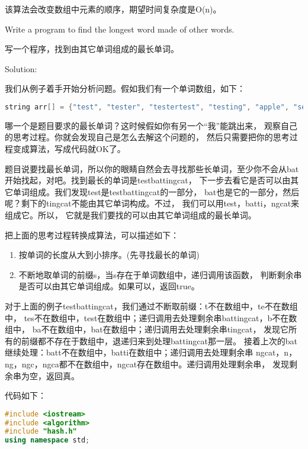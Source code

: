\begin{description}
\begin{description}
该算法会改变数组中元素的顺序，期望时间复杂度是O(n)。
\end{description}
%


\item[20.7] Write a program to find the longest word made of other words.

写一个程序，找到由其它单词组成的最长单词。

Solution:

我们从例子着手开始分析问题。假如我们有一个单词数组，如下：
\begin{lstlisting}[language=C++]
string arr[] = {"test", "tester", "testertest", "testing", "apple", "seattle", "banana",  "batting", "ngcat", "batti","bat", "testingtester", "testbattingcat"};
\end{lstlisting}
哪一个是题目要求的最长单词？这时候假如你有另一个“我”能跳出来， 观察自己的思考过程。你就会发现自己是怎么去解这个问题的， 然后只需要把你的思考过程变成算法，写成代码就OK了。

题目说要找最长单词，所以你的眼睛自然会去寻找那些长单词，至少你不会从bat 开始找起，对吧。找到最长的单词是testbattingcat， 下一步去看它是否可以由其它单词组成。我们发现test是testbattingcat的一部分， bat也是它的一部分，然后呢？剩下的tingcat不能由其它单词构成。不过， 我们可以用test，batti，ngcat来组成它。所以， 它就是我们要找的可以由其它单词组成的最长单词。

把上面的思考过程转换成算法，可以描述如下：
\begin{enumerate}
\item 按单词的长度从大到小排序。(先寻找最长的单词)
\item 不断地取单词的前缀s，当s存在于单词数组中，递归调用该函数， 判断剩余串是否可以由其它单词组成。如果可以，返回true。
\end{enumerate}
对于上面的例子testbattingcat，我们通过不断取前缀：t不在数组中，te不在数组中， tes不在数组中，test在数组中；递归调用去处理剩余串battingcat，b不在数组中， ba不在数组中，bat在数组中；递归调用去处理剩余串tingcat， 发现它所有的前缀都不存在于数组中，退递归来到处理battingcat那一层。 接着上次的bat继续处理：batt不在数组中，batti在数组中；递归调用去处理剩余串 ngcat，n，ng，ngc，ngca都不在数组中，ngcat存在数组中。递归调用处理剩余串， 发现剩余串为空，返回真。

代码如下：

%
\begin{lstlisting}[language=C++]
#include <iostream>
#include <algorithm>
#include "hash.h"
using namespace std;


\end{lstlisting}
\end{description}
